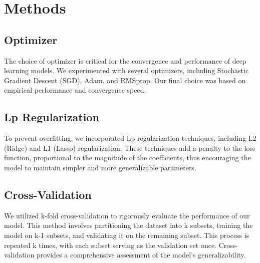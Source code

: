 \section{Methods}
\label{sec:methods}


\subsection{Optimizer}
The choice of optimizer is critical for the convergence and performance of deep learning models. We experimented with several optimizers, including Stochastic Gradient Descent (SGD), Adam, and RMSprop. Our final choice was based on empirical performance and convergence speed.

\subsection{Lp Regularization}
To prevent overfitting, we incorporated Lp regularization techniques, including L2 (Ridge) and L1 (Lasso) regularization. These techniques add a penalty to the loss function, proportional to the magnitude of the coefficients, thus encouraging the model to maintain simpler and more generalizable parameters.

\subsection{Cross-Validation}
We utilized k-fold cross-validation to rigorously evaluate the performance of our model. This method involves partitioning the dataset into k subsets, training the model on k-1 subsets, and validating it on the remaining subset. This process is repeated k times, with each subset serving as the validation set once. Cross-validation provides a comprehensive assessment of the model’s generalizability.



